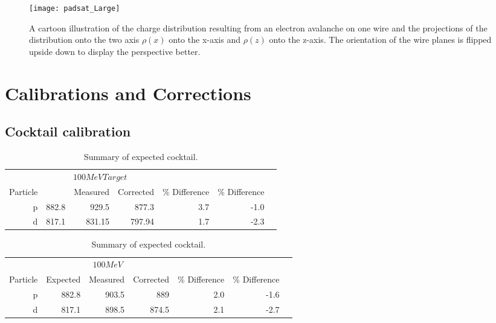 \begin{figure}[H]
\texttt{[image: padsat\_Large]}
\caption{A cartoon illustration of the charge distribution resulting from an electron avalanche on one wire and the projections of the distribution onto the two axis $\rho(x)$ onto the x-axis and $\rho(z)$ onto the z-axis. The orientation of the wire planes is flipped upside down to display the perspective better.}
\label{fig:prf}
\end{figure}



\section{Calibrations and Corrections}


\subsection{Cocktail calibration}

\begin{table*}\centering
{}
\begin{tabular}{@{}rrrrrrr@{}}\toprule
& \multicolumn{3}{c}{$100 MeV Target$}\\
\cmidrule{2-4}
Particle &\phantom{abc} & Measured & Corrected & \% Difference & \% Difference\\
\midrule
p   & 882.8 & 929.5 & 877.3   &  3.7  & -1.0  \\
d   & 817.1 & 831.15 & 797.94 &  1.7  & -2.3\\
\bottomrule
\end{tabular}
\caption{Summary of expected cocktail. }
\label{tb:cocktail100tar}
\end{table*}

\begin{table*}\centering
{}
\begin{tabular}{@{}rrrrrrr@{}}\toprule
& \multicolumn{3}{c}{$100 MeV$}\\
\cmidrule{2-4}
Particle & Expected & Measured & Corrected & \% Difference & \% Difference\\
\midrule
p   & 882.8 & 903.5 & 889   &  2.0   & -1.6  \\
d   & 817.1 & 898.5 & 874.5 &  2.1   & -2.7\\
\bottomrule
\end{tabular}
\caption{Summary of expected cocktail. }
\label{tb:cocktail100}
\end{table*}


